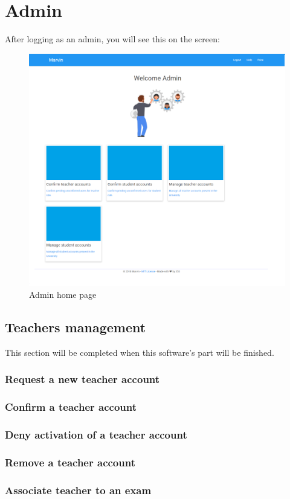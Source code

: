 \documentclass[ManualeUtente]{subfiles}
\begin{document}
\chapter{Admin}
After logging as an admin, you will see this on the screen:
\begin{figure}[H]
	\centering
	\includegraphics[width=0.7\linewidth]{image/Admin}
	\caption[Admin home page]{Admin home page}
	\label{fig:universityaddamin}
\end{figure}
\section{Teachers management}
This section will be completed when this software's part will be finished.
\subsection{Request a new teacher account}
\subsection{Confirm a teacher account}
\subsection{Deny activation of a teacher account}
\subsection{Remove a teacher account}
\subsection{Associate teacher to an exam}
\end{document}

